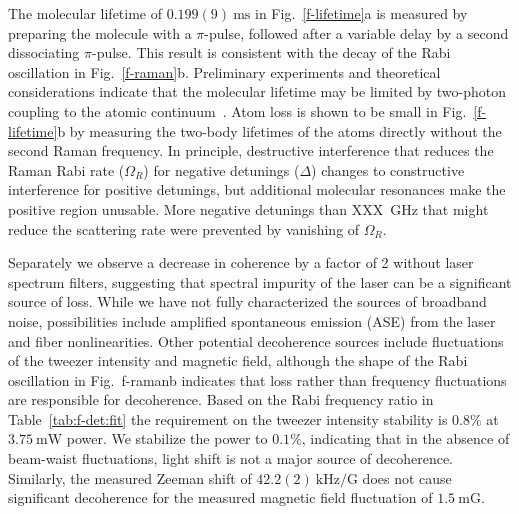\documentclass[aps,prl,twocolumn,10pt,superscriptaddress]{revtex4-1}
\begin{document}
The molecular lifetime of $0.199(9)~\mathrm{ms}$ in Fig.~\ref{f-lifetime}a is measured by preparing the molecule with a $\pi$-pulse,
followed after a variable delay by a second dissociating $\pi$-pulse.
This result is
consistent with the decay of the Rabi oscillation in Fig.~\ref{f-raman}b. Preliminary experiments and theoretical considerations indicate that the molecular lifetime may be limited by two-photon coupling to the atomic continuum~\cite{YichaoYu}.  Atom loss is shown to be small in Fig.~\ref{f-lifetime}b by measuring the two-body lifetimes of the atoms directly without the second Raman frequency. In principle, destructive interference that reduces the Raman Rabi rate ($\Omega_R$) for negative detunings ($\Delta$) changes to constructive interference for positive detunings, but additional molecular resonances make the positive region unusable.  More negative detunings than XXX~GHz that might reduce the scattering rate were prevented by vanishing of $\Omega_R$.

Separately we observe a decrease in coherence by a factor of 2 without laser spectrum filters,
suggesting that spectral impurity of the laser can be a significant source of loss.   While we have not fully characterized the sources
of broadband noise, possibilities include amplified spontaneous emission (ASE) from the laser and fiber nonlinearities. Other potential decoherence sources include
fluctuations of the tweezer intensity and magnetic field, although the shape of the Rabi oscillation in Fig.~{f-raman}b indicates that loss rather than frequency fluctuations are responsible for decoherence.
Based on the Rabi frequency ratio in Table~\ref{tab:f-det:fit}
the requirement on the tweezer intensity stability is $0.8\mathrm{\%}$ at $3.75~\mathrm{mW}$ power. We stabilize the power to $0.1\mathrm{\%}$, indicating that in the absence of beam-waist fluctuations, light shift is not a major source of decoherence.
Similarly, the measured Zeeman shift of $42.2(2)~\mathrm{kHz/G}$
does not cause significant decoherence for the measured magnetic field
fluctuation of $1.5~\mathrm{mG}$.

\end{document}
